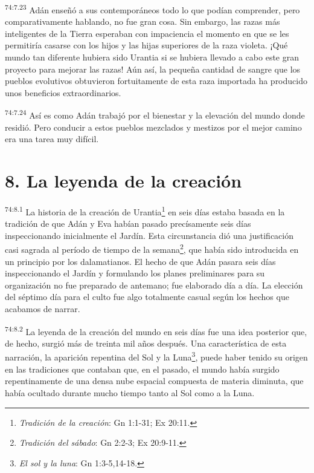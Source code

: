 \par
\textsuperscript{74:7.23} Adán enseñó a sus contemporáneos todo lo que podían comprender, pero comparativamente hablando, no fue gran cosa. Sin embargo, las razas más inteligentes de la Tierra esperaban con impaciencia el momento en que se les permitiría casarse con los hijos y las hijas superiores de la raza violeta. ¡Qué mundo tan diferente hubiera sido Urantia si se hubiera llevado a cabo este gran proyecto para mejorar las razas! Aún así, la pequeña cantidad de sangre que los pueblos evolutivos obtuvieron fortuitamente de esta raza importada ha producido unos beneficios extraordinarios.

\par
\textsuperscript{74:7.24} Así es como Adán trabajó por el bienestar y la elevación del mundo donde residió. Pero conducir a estos pueblos mezclados y mestizos por el mejor camino era una tarea muy difícil.

\section*{8. La leyenda de la creación}
\par
\textsuperscript{74:8.1} La historia de la creación de Urantia\footnote{\textit{Tradición de la creación}: Gn 1:1-31; Ex 20:11.} en seis días estaba basada en la tradición de que Adán y Eva habían pasado precísamente seis días inspeccionando inicialmente el Jardín. Esta circunstancia dió una justificación casi sagrada al período de tiempo de la semana\footnote{\textit{Tradición del sábado}: Gn 2:2-3; Ex 20:9-11.}, que había sido introducida en un principio por los dalamatianos. El hecho de que Adán pasara seis días inspeccionando el Jardín y formulando los planes preliminares para su organización no fue preparado de antemano; fue elaborado día a día. La elección del séptimo día para el culto fue algo totalmente casual según los hechos que acabamos de narrar.

\par
\textsuperscript{74:8.2} La leyenda de la creación del mundo en seis días fue una idea posterior que, de hecho, surgió más de treinta mil años después. Una característica de esta narración, la aparición repentina del Sol y la Luna\footnote{\textit{El sol y la luna}: Gn 1:3-5,14-18.}, puede haber tenido su origen en las tradiciones que contaban que, en el pasado, el mundo había surgido repentinamente de una densa nube espacial compuesta de materia diminuta, que había ocultado durante mucho tiempo tanto al Sol como a la Luna.

